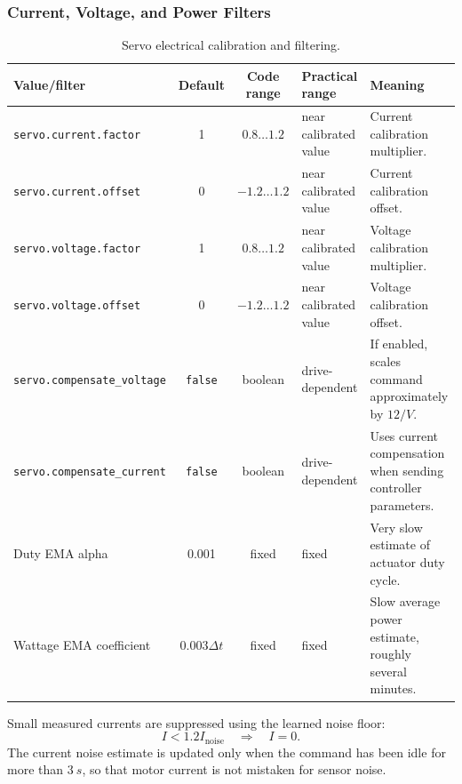 \documentclass[11pt,twocolumn]{article}
\begin{document}
\subsubsection{Current, Voltage, and Power Filters}
\begin{table}[t]
\centering
\caption{Servo electrical calibration and filtering.}
\label{tab:pypilot-servo-electrical}
\begin{tabularx}{\textwidth}{Z{0.23\textwidth}c c Z{0.16\textwidth}Y}
\toprule
Value/filter & Default & Code range & Practical range & Meaning \\
\midrule
\texttt{servo.current.factor} &
\num{1} &
\(\num{0.8}\ldots\num{1.2}\) &
near calibrated value &
Current calibration multiplier. \\
\texttt{servo.current.offset} &
\num{0} &
\(\num{-1.2}\ldots\num{1.2}\) &
near calibrated value &
Current calibration offset. \\
\texttt{servo.voltage.factor} &
\num{1} &
\(\num{0.8}\ldots\num{1.2}\) &
near calibrated value &
Voltage calibration multiplier. \\
\texttt{servo.voltage.offset} &
\num{0} &
\(\num{-1.2}\ldots\num{1.2}\) &
near calibrated value &
Voltage calibration offset. \\
\texttt{servo.compensate\_voltage} &
\texttt{false} &
boolean &
drive-dependent &
If enabled, scales command approximately by \(12/V\). \\
\texttt{servo.compensate\_current} &
\texttt{false} &
boolean &
drive-dependent &
Uses current compensation when sending controller parameters. \\
Duty EMA alpha &
\num{0.001} &
fixed &
fixed &
Very slow estimate of actuator duty cycle. \\
Wattage EMA coefficient &
\(0.003\Delta t\) &
fixed &
fixed &
Slow average power estimate, roughly several minutes. \\
\bottomrule
\end{tabularx}
\end{table}
Small measured currents are suppressed using the learned noise floor:
\[
I < 1.2 I_{\mathrm{noise}}
\quad\Longrightarrow\quad
I=0.
\]
The current noise estimate is updated only when the command has been idle
for more than \(\SI{3}{s}\), so that motor current is not mistaken for
sensor noise.
\end{document}
